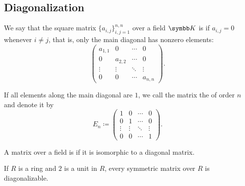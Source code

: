 \subsection{Diagonalization}\label{subsec:diagonalization}

\begin{definition}\label{def:diagonal_matrix}
  We say that the square matrix \( \{ a_{i,j} \}_{i,j=1}^{n,n} \) over a field \( \BK \) is  if \( a_{i,j} = 0 \) whenever \( i \neq j \), that is, only the main diagonal has nonzero elements:
  \begin{equation*}
    \begin{pmatrix}
      a_{1,1} & 0       & \cdots & 0 \\
      0       & a_{2,2} & \cdots & 0 \\
      \vdots  & \vdots  & \ddots & \vdots \\
      0       & 0       & \cdots & a_{n,n}
    \end{pmatrix}.
  \end{equation*}

  If all elements along the main diagonal are \( 1 \), we call the matrix the  of order \( n \) and denote it by
  \begin{equation*}
    E_n \coloneqq
    \begin{pmatrix}
      1       & 0       & \cdots & 0 \\
      0       & 1       & \cdots & 0 \\
      \vdots  & \vdots  & \ddots & \vdots \\
      0       & 0       & \cdots & 1
    \end{pmatrix}.
  \end{equation*}
\end{definition}

\begin{definition}\label{def:diagonalizable_matrix}
  A matrix over a field is  if it is isomorphic to a diagonal matrix.
\end{definition}

\begin{theorem}\label{def:spectral_theorem_for_matrices}\cite[theorem 6.5]{Knapp2016BAlg}
  If \( R \) is a ring and \( 2 \) is a unit in \( R \), every symmetric matrix over \( R \) is diagonalizable.
\end{theorem}
